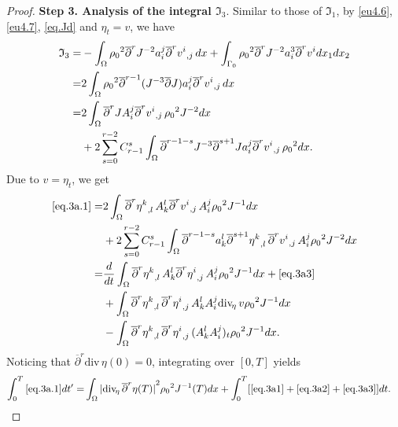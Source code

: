 \documentclass[12pt,twoside,reqno]{amsart}
\numberwithin{equation}{section}
\theoremstyle{definition}
\theoremstyle{remark}
\begin{document}
\begin{proof}
\textbf{Step 3. Analysis of the integral ${\mathfrak{I}}_3$}.
 Similar to those of ${\mathfrak{I}}_1$, by \eqref{eu4.6}, \eqref{eu4.7}, \eqref{eq.Jd} and $\eta_t=v$, we have
\begin{align}
  {\mathfrak{I}}_3=&-\int_\Omega{\rho_0}^2   {\overline{\partial}}^r J^{-2}a^j_i{{{{\overline{\partial}}^r v^i}}_{,{j}}\,}dx+\int_{\Gamma_0}{\rho_0}^2   {\overline{\partial}}^r J^{-2}a^3_i{\overline{\partial}}^r v^i dx_1dx_2{\nonumber}\\
  =&2\int_\Omega {\rho_0}^2   {\overline{\partial}}^{r-1}( J^{-3}{\overline{\partial}} J)a^j_i{{{{\overline{\partial}}^r v^i}}_{,{j}}\,}dx{\nonumber}\\
  =&2\int_\Omega{\overline{\partial}}^{r} J A^j_i{{{{\overline{\partial}}^r v^i}}_{,{j}}\,}{\rho_0}^2   J^{-2}dx\label{eq.3a.1}\\
  &+2\sum_{s=0}^{r-2} C_{r-1}^s \int_\Omega {\overline{\partial}}^{r-1-s} J^{-3}{\overline{\partial}}^{s+1} J a^j_i{{{{\overline{\partial}}^r v^i}}_{,{j}}\,}{\rho_0}^2  dx.\label{eq.3b.1}
\end{align}
Due to $v=\eta_t$,  we get
\begin{align}
  \eqref{eq.3a.1}=&2\int_\Omega {\overline{\partial}}^r{{{\eta^k}}_{,{l}}\,}A^l_k {{{{\overline{\partial}}^r v^i}}_{,{j}}\,}A^j_i{\rho_0}^2   J^{-1} dx\label{eq.3a0}\\
  &+2\sum_{s=0}^{r-2} C_{r-1}^s\int_\Omega{\overline{\partial}}^{r-1-s} a_k^l{\overline{\partial}}^{s+1} {{{\eta^k}}_{,{l}}\,}{{{{\overline{\partial}}^r v^i}}_{,{j}}\,}A^j_i {\rho_0}^2   J^{-2}dx\label{eq.3a3}\\
  =& \frac{d}{dt}\int_\Omega {\overline{\partial}}^r{{{\eta^k}}_{,{l}}\,}A^l_k {{{{\overline{\partial}}^r \eta^i}}_{,{j}}\,}A^j_i {\rho_0}^2   J^{-1}dx+\eqref{eq.3a3}{\nonumber}\\
  &+ \int_\Omega {\overline{\partial}}^r{{{\eta^k}}_{,{l}}\,} {{{{\overline{\partial}}^r \eta^i}}_{,{j}}\,}A^l_k A^j_i {\mathrm{div}_{\!\eta}\,} v {\rho_0}^2  J^{-1}dx\label{eq.3a1}\\
  &- \int_\Omega {\overline{\partial}}^r{{{\eta^k}}_{,{l}}\,} {{{{\overline{\partial}}^r \eta^i}}_{,{j}}\,}(A^l_k A^j_i)_t {\rho_0}^2   J^{-1}dx.\label{eq.3a2}
\end{align}
Noticing that ${\overline{\partial}}^r{\mathrm{div}\,}\eta(0)=0$, integrating over $[0,T]$ yields
\begin{align*}
  \int_0^T \eqref{eq.3a.1} dt'=&\int_\Omega {\vert{{\mathrm{div}_{\!\eta}\,}{\overline{\partial}}^r\eta(T)}\vert}^2 {\rho_0}^2   J^{-1}(T)dx+\int_0^T[\eqref{eq.3a1}+\eqref{eq.3a2}+\eqref{eq.3a3}]dt.
\end{align*}


\end{proof}
\end{document}
